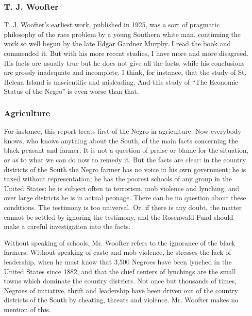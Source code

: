 \documentclass[letterpaper,10pt,english]{jupyterBook}
\begin{document}
\subsubsection{T. J. Woofter}
\label{\detokenize{Volumes/38/03/woofterism:t-j-woofter}}
\sphinxAtStartPar
T. J. Woofter’s earliest work, published in 1925, was a sort of pragmatic philosophy of the race problem by a young Southern white man, continuing the work so well begun by the late Edgar Gardner Murphy. I read the book and commended it. But with his more recent studies, I have more and more disagreed. His facts are usually true but he does not give all the facts, while his conclusions are grossly inadequate and incomplete. I think, for instance, that the study of St. Helena Island is unscientific and misleading. And this study of “The Economic Status of the Negro” is even worse than that.


\subsubsection{Agriculture}
\label{\detokenize{Volumes/38/03/woofterism:agriculture}}
\sphinxAtStartPar
For instance, this report treats first of the Negro in agriculture. Now everybody knows, who knows anything about the South, of the main facts concerning the black peasant and farmer. It is not a question of praise or blame for the situation, or as to what we can do now to remedy it. But the facts are clear: in the country districts of the South the Negro farmer has no voice in his own government; he is taxed without representation; he has the poorest schools of any group in the United States; he is subject often to terrorism, mob violence and lynching; and over large districts he is in actual peonage. There can be no question about these conditions. The testimony is too universal. Or, if there is any doubt, the matter cannot be settled by ignoring the testimony, and the Rosenwald Fund should make a careful investigation into the facts.

\sphinxAtStartPar
Without speaking of schools, Mr. Woofter refers to the ignorance of the black farmers. Without speaking of caste and mob violence, he stresses the lack of leadership, when he must know that 3,500 Negroes have been lynched in the United States since 1882, and that the chief centers of lynchings are the small towns which dominate the country districts. Not once but thousands of times, Negroes of initiative, thrift and leadership have been driven out of the country districts of the South by cheating, threats and violence. Mr. Woofter makes no mention of this.
\end{document}
